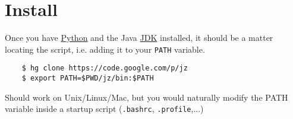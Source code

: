
\section{ Install }

Once you have  \href{http://python.org}{Python} and the Java
 \href{http:openjdk.java.net}{JDK} installed, it should be a matter
locating the script, i.e. adding it to your \texttt{PATH} variable.


{\small
\begin{verbatim}
    $ hg clone https://code.google.com/p/jz
    $ export PATH=$PWD/jz/bin:$PATH
\end{verbatim}
}


Should work on Unix/Linux/Mac, but you would naturally modify
the PATH variable inside a startup script (\texttt{.bashrc}, \texttt{.profile},...)


